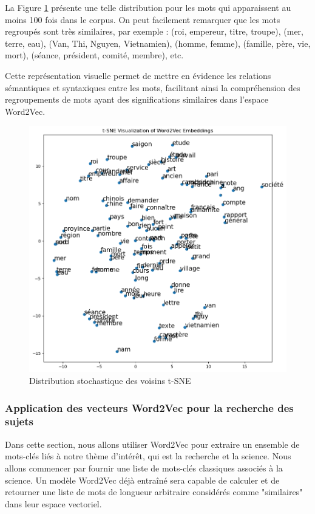 La Figure \ref{sne} présente une telle distribution pour les mots qui apparaissent au moins 100 fois dans le corpus. On peut facilement remarquer que les mots regroupés sont très similaires, par exemple : (roi, empereur, titre, troupe), (mer, terre, eau), (Van, Thi, Nguyen, Vietnamien), (homme, femme), (famille, père, vie, mort), (séance, président, comité, membre), etc.

Cette représentation visuelle permet de mettre en évidence les relations sémantiques et syntaxiques entre les mots, facilitant ainsi la compréhension des regroupements de mots ayant des significations similaires dans l'espace Word2Vec.

\begin{figure}[H] %
    \centering
    \includegraphics[width=14cm]{img/SNE.png}
    \caption{Distribution stochastique des voisins t-SNE}
    \label{sne}
\end{figure}

\subsubsection{Application des vecteurs Word2Vec pour la recherche des sujets}

Dans cette section, nous allons utiliser Word2Vec pour extraire un ensemble de mots-clés liés à notre thème d'intérêt, qui est la recherche et la science. Nous allons commencer par fournir une liste de mots-clés classiques associés à la science. Un modèle Word2Vec déjà entraîné sera capable de calculer et de retourner une liste de mots de longueur arbitraire considérés comme "similaires" dans leur espace vectoriel.

